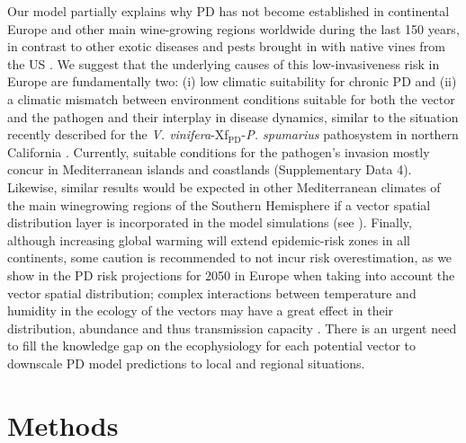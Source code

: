     Our model partially explains why PD has not become established in
    continental
    Europe and other main wine-growing regions worldwide during the last 150
    years,
    in contrast to other exotic diseases and pests brought in with native vines
    from the US \cite{Borkarbook, Brewer2010, Rouxel2014, Tello2019}. We
    suggest
    that the underlying causes of this low-invasiveness risk in Europe are
    fundamentally two: (i) low climatic suitability for chronic PD and (ii) a
    climatic mismatch between environment conditions suitable for both the
    vector
    and the pathogen and their interplay in disease dynamics, similar to the
    situation recently described for the \textit{V.
        vinifera}-Xf$_{\textrm{PD}}$-{\textit{P. spumarius}} pathosystem in
    northern
    California \cite{Beal2021}. Currently, suitable conditions for the
    pathogen's
    invasion mostly concur in Mediterranean islands and coastlands
    (Supplementary
    Data 4). Likewise, similar results would be expected in other Mediterranean
    climates of the main winegrowing regions of the Southern Hemisphere if a
    vector
    spatial distribution layer is incorporated in the model simulations (see
    \cite{Webpage}). Finally, although increasing global warming will extend
    epidemic-risk zones in all continents, some caution is recommended to not
    incur
    risk overestimation, as we show in the PD risk projections for 2050 in
    Europe
    when taking into account the vector spatial distribution; complex
    interactions
    between temperature and humidity in the ecology of the vectors may have a
    great
    effect in their distribution, abundance and thus transmission capacity
    \cite{Godefroid2021}. There is an urgent need to fill the knowledge gap on
    the
    ecophysiology for each potential vector to downscale PD model predictions
    to
    local and regional situations.

    \section{Methods}
